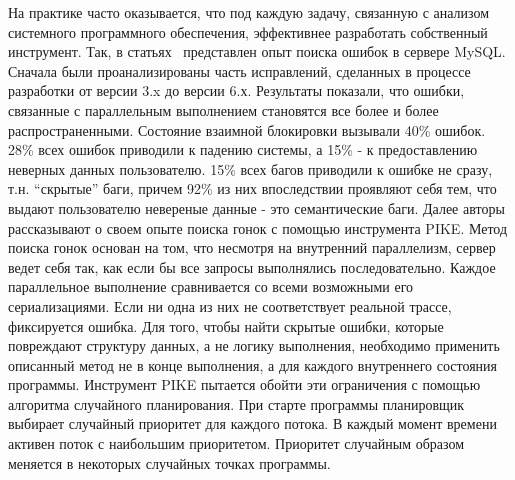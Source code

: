 На практике часто оказывается, что под каждую задачу, связанную с анализом системного программного обеспечения, эффективнее разработать собственный инструмент.
Так, в статьях~\cite{Fonseca:2010,Fonseca:2011} представлен опыт поиска ошибок в сервере MySQL.
Сначала были проанализированы часть исправлений, сделанных в процессе разработки от версии 3.x до версии 6.х.
Результаты показали, что ошибки, связанные с параллельным выполнением становятся все более и более распространенными.
Состояние взаимной блокировки вызывали 40\% ошибок. 28\% всех ошибок приводили к падению системы, а 15\% - к предоставлению неверных данных пользователю.
15\% всех багов приводили к ошибке не сразу, т.н. “скрытые” баги, причем 92\% из них впоследствии проявляют себя тем, что выдают пользователю невереные данные - это семантические баги.
Далее авторы рассказывают о своем опыте поиска гонок с помощью инструмента PIKE.
Метод поиска гонок основан на том, что несмотря на внутренний параллелизм, сервер ведет себя так, как если бы все запросы выполнялись последовательно. 
Каждое параллельное выполнение сравнивается со всеми возможными его сериализациями.
Если ни одна из них не соответствует реальной трассе, фиксируется ошибка. 
Для того, чтобы найти скрытые ошибки, которые повреждают структуру данных, а не логику выполнения, необходимо применить описанный метод не в конце выполнения, а для каждого внутреннего состояния программы.
Инструмент PIKE пытается обойти эти ограничения с помощью алгоритма случайного планирования. При старте программы планировщик выбирает случайный приоритет для каждого потока. В каждый момент времени активен поток с наибольшим приоритетом.
Приоритет случайным образом меняется в некоторых случайных точках программы. 

